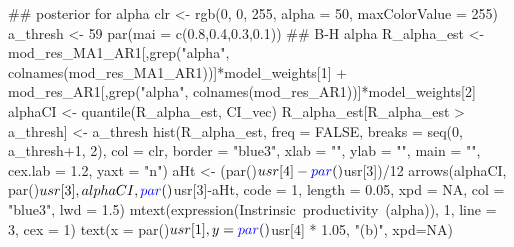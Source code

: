\documentclass[
  11pt,
]{article}
\newenvironment{Shaded}{}{}
\newcommand{\CommentTok}[1]{\textcolor[rgb]{0.00,0.50,0.00}{#1}}
\newcommand{\DataTypeTok}[1]{#1}
\newcommand{\DecValTok}[1]{#1}
\newcommand{\FloatTok}[1]{#1}
\newcommand{\KeywordTok}[1]{\textcolor[rgb]{0.00,0.00,1.00}{#1}}
\newcommand{\NormalTok}[1]{#1}
\newcommand{\OperatorTok}[1]{#1}
\newcommand{\OtherTok}[1]{\textcolor[rgb]{1.00,0.25,0.00}{#1}}
\newcommand{\StringTok}[1]{\textcolor[rgb]{0.00,0.50,0.50}{#1}}
\begin{document}
\begin{Shaded}
\begin{Highlighting}[]
\CommentTok{## posterior for alpha}
\NormalTok{clr <-}\StringTok{ }\KeywordTok{rgb}\NormalTok{(}\DecValTok{0}\NormalTok{, }\DecValTok{0}\NormalTok{, }\DecValTok{255}\NormalTok{, }\DataTypeTok{alpha =} \DecValTok{50}\NormalTok{, }\DataTypeTok{maxColorValue =} \DecValTok{255}\NormalTok{)}
\NormalTok{a_thresh <-}\StringTok{ }\DecValTok{59}
\KeywordTok{par}\NormalTok{(}\DataTypeTok{mai =} \KeywordTok{c}\NormalTok{(}\FloatTok{0.8}\NormalTok{,}\FloatTok{0.4}\NormalTok{,}\FloatTok{0.3}\NormalTok{,}\FloatTok{0.1}\NormalTok{))}
\CommentTok{## B-H alpha}
\NormalTok{R_alpha_est <-}\StringTok{ }\NormalTok{mod_res_MA1_AR1[,}\KeywordTok{grep}\NormalTok{(}\StringTok{"alpha"}\NormalTok{, }\KeywordTok{colnames}\NormalTok{(mod_res_MA1_AR1))]}\OperatorTok{*}\NormalTok{model_weights[}\DecValTok{1}\NormalTok{] }\OperatorTok{+}\StringTok{ }\NormalTok{mod_res_AR1[,}\KeywordTok{grep}\NormalTok{(}\StringTok{"alpha"}\NormalTok{, }\KeywordTok{colnames}\NormalTok{(mod_res_AR1))]}\OperatorTok{*}\NormalTok{model_weights[}\DecValTok{2}\NormalTok{] }
\NormalTok{alphaCI <-}\StringTok{ }\KeywordTok{quantile}\NormalTok{(R_alpha_est, CI_vec)}
\NormalTok{R_alpha_est[R_alpha_est }\OperatorTok{>}\StringTok{ }\NormalTok{a_thresh] <-}\StringTok{ }\NormalTok{a_thresh}
\KeywordTok{hist}\NormalTok{(R_alpha_est, }\DataTypeTok{freq =} \OtherTok{FALSE}\NormalTok{, }\DataTypeTok{breaks =} \KeywordTok{seq}\NormalTok{(}\DecValTok{0}\NormalTok{, a_thresh}\OperatorTok{+}\DecValTok{1}\NormalTok{, }\DecValTok{2}\NormalTok{),}
     \DataTypeTok{col =}\NormalTok{ clr, }\DataTypeTok{border =} \StringTok{"blue3"}\NormalTok{,}
     \DataTypeTok{xlab =} \StringTok{""}\NormalTok{, }\DataTypeTok{ylab =} \StringTok{""}\NormalTok{, }\DataTypeTok{main =} \StringTok{""}\NormalTok{, }\DataTypeTok{cex.lab =} \FloatTok{1.2}\NormalTok{, }\DataTypeTok{yaxt =} \StringTok{"n"}\NormalTok{)}
\NormalTok{aHt <-}\StringTok{ }\NormalTok{(}\KeywordTok{par}\NormalTok{()}\OperatorTok{$}\NormalTok{usr[}\DecValTok{4}\NormalTok{]}\OperatorTok{-}\KeywordTok{par}\NormalTok{()}\OperatorTok{$}\NormalTok{usr[}\DecValTok{3}\NormalTok{])}\OperatorTok{/}\DecValTok{12}
\KeywordTok{arrows}\NormalTok{(alphaCI, }\KeywordTok{par}\NormalTok{()}\OperatorTok{$}\NormalTok{usr[}\DecValTok{3}\NormalTok{], alphaCI,}\KeywordTok{par}\NormalTok{()}\OperatorTok{$}\NormalTok{usr[}\DecValTok{3}\NormalTok{]}\OperatorTok{-}\NormalTok{aHt,}
       \DataTypeTok{code =} \DecValTok{1}\NormalTok{, }\DataTypeTok{length =} \FloatTok{0.05}\NormalTok{, }\DataTypeTok{xpd =} \OtherTok{NA}\NormalTok{, }\DataTypeTok{col =} \StringTok{"blue3"}\NormalTok{, }\DataTypeTok{lwd =} \FloatTok{1.5}\NormalTok{)}
\KeywordTok{mtext}\NormalTok{(}\KeywordTok{expression}\NormalTok{(Instrinsic}\OperatorTok{~}\NormalTok{productivity}\OperatorTok{~}\NormalTok{(alpha)), }\DecValTok{1}\NormalTok{, }\DataTypeTok{line =} \DecValTok{3}\NormalTok{, }\DataTypeTok{cex =} \DecValTok{1}\NormalTok{)}
\KeywordTok{text}\NormalTok{(}\DataTypeTok{x =} \KeywordTok{par}\NormalTok{()}\OperatorTok{$}\NormalTok{usr[}\DecValTok{1}\NormalTok{],}
     \DataTypeTok{y =} \KeywordTok{par}\NormalTok{()}\OperatorTok{$}\NormalTok{usr[}\DecValTok{4}\NormalTok{] }\OperatorTok{*}\StringTok{ }\FloatTok{1.05}\NormalTok{,}
     \StringTok{"(b)"}\NormalTok{, }\DataTypeTok{xpd=}\OtherTok{NA}\NormalTok{)}


\end{Highlighting}
\end{Shaded}
\end{document}
